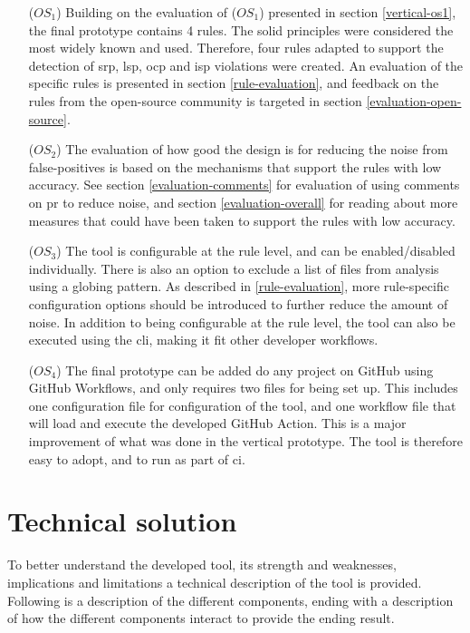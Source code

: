\documentclass[pdftex,10pt,b5paper,twoside]{report}
\begin{document}
\begin{itemize}
    \item [(\(OS_{1}\))] Building on the evaluation of (\(OS_{1}\)) presented in section \ref{vertical-os1}, the final prototype contains 4 rules. The \gls{solid} principles were considered the most widely known and used. Therefore, four rules adapted to support the detection of \gls{srp}, \gls{lsp}, \gls{ocp} and \gls{isp} violations were created. An evaluation of the specific rules is presented in section \ref{rule-evaluation}, and feedback on the rules from the open-source community is targeted in section \ref{evaluation-open-source}.
    
    \item [(\(OS_{2}\))] The evaluation of how good the design is for reducing the noise from false-positives is based on the mechanisms that support the rules with low accuracy. See section \ref{evaluation-comments} for evaluation of using comments on \gls{pr} to reduce noise, and section \ref{evaluation-overall} for reading about more measures that could have been taken to support the rules with low accuracy. 
    
    \item [(\(OS_{3}\))] The tool is configurable at the rule level, and can be enabled/disabled individually. There is also an option to exclude a list of files from analysis using a globing pattern. As described in \ref{rule-evaluation}, more rule-specific configuration options should be introduced to further reduce the amount of noise. In addition to being configurable at the rule level, the tool can also be executed using the \gls{cli}, making it fit other developer workflows. 
    
    \item [(\(OS_{4}\))] The final prototype can be added do any project on GitHub using GitHub Workflows, and only requires two files for being set up. This includes one configuration file for configuration of the tool, and one workflow file that will load and execute the developed GitHub Action. This is a major improvement of what was done in the vertical prototype. The tool is therefore easy to adopt, and to run as part of \gls{ci}.

\end{itemize}

\section{Technical solution}
\label{technical-solution}
To better understand the developed tool, its strength and weaknesses, implications and limitations a technical description of the tool is provided. Following is a description of the different components, ending with a description of how the different components interact to provide the ending result.
\end{document}
